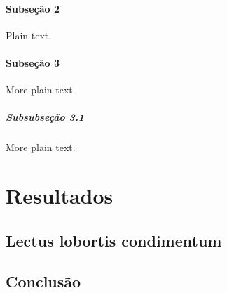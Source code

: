 \documentclass[12pt,openright,twoside,a4paper]{abntex2}
\begin{document}
\lipsum[6-10]

\subsection{Subseção 2}

Plain text.

\lipsum[11-15]

\subsection{Subseção 3}

More plain text.

\lipsum[16-17]

\subsubsection{Subsubseção 3.1}

More plain text.

\lipsum[18-20]

\part{Resultados}


\chapter{Lectus lobortis condimentum}

\lipsum[21-23]




\chapter*{Conclusão}

\lipsum[31-33]


\end{document}
